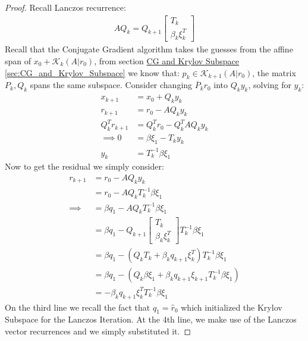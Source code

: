 \documentclass[]{article}
\theoremstyle{definition}
\begin{document}
            \begin{proof}
                Recall Lanczos recurrence:
                \begin{align}
                    AQ_k = Q_{k + 1} \begin{bmatrix}
                        T_k
                        \\
                        \beta_k \xi_k^T
                    \end{bmatrix}
                \end{align}
                Recall that the Conjugate Gradient algorithm takes the guesses from the affine span of $x_0 + \mathcal{K}_k(A|r_0)$, from section \hyperref[sec:CG_and_Krylov_Subspace]{CG and Krylov Subspace \ref*{sec:CG_and_Krylov_Subspace}} we know that: $p_k \in \mathcal K_{k + 1}(A|r_0)$, the matrix $P_k, Q_k$ spans the same subspace. Consider changing $\overline{P}_kr_0$ into $Q_ky_k$, solving for $y_k$: 
                \begin{align}
                    x_{k + 1} &= x_0 + Q_ky_k
                    \\
                    r_{k + 1} &= r_0 - AQ_k y_k
                    \\
                    Q^T_kr_{k + 1} &= Q_k^T r_0 - Q_k^TAQ_k y_k
                    \\
                    \implies
                    0 &= \beta\xi_1 - T_k y_k
                    \\
                    y_k &= T_k^{-1}\beta \xi_1
                \end{align}
                Now to get the residual we simply consider: 
                \begin{align}
                    r_{k + 1} &= r_0 - AQ_k y_k
                    \\
                    &= r_0 - AQ_k T_k^{-1}\beta \xi_1
                    \\
                    \implies
                    &= \beta q_1 - AQ_k T_k^{-1} \beta\xi_1
                    \\
                    &= \beta q_1 - Q_{k + 1}\begin{bmatrix}
                        T_k \\ \beta_k \xi_k^T
                    \end{bmatrix}T_k^{-1} \beta\xi_1
                    \\
                    &= \beta q_1 - 
                    (Q_k T_k + \beta_k q_{k + 1}\xi_k^T)T_k^{-1} \beta\xi_1
                    \\
                    &= 
                    \beta q_1 - (Q_k \beta \xi_1 + \beta_k q_{k + 1}\xi_{k + 1}T_k^{-1}\beta \xi_1)
                    \\
                    &= -\beta_k q_{k + 1}\xi_k^TT_k^{-1} \beta \xi_1
                \end{align}
                On the third line we recall the fact that $q_1 = \hat{r}_0$ which initialized the Krylov Subspace for the Lanczos Iteration. At the 4th line, we make use of the Lanczos vector recurrences and we simply substituted it.


\end{proof}
\end{document}
